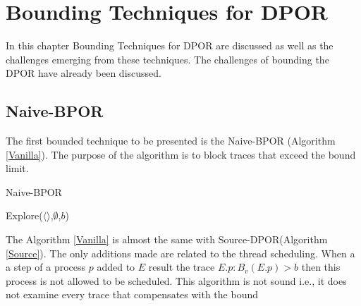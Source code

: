 \chapter{Bounding Techniques for DPOR}
\label{bounded}

In this chapter Bounding Techniques for DPOR are discussed as well as the challenges emerging from these techniques.
The challenges of bounding the DPOR have already been discussed.


\section{Naive-BPOR}

The first bounded technique to be presented is the Naive-BPOR (Algorithm \ref{Vanilla}). The purpose of the algorithm is to block traces that exceed the bound
limit. 

\begin{algorithm}
    \caption{Naive-BPOR}
    \label{Vanilla}
    Explore($\langle \rangle$,$\emptyset$,$b$)\;
\end{algorithm}

The Algorithm \ref{Vanilla} is almost the same with Source-DPOR(Algorithm \ref{Source}). The only additions made are
related to the thread scheduling. When a a step of a process $p$ added to $E$ result the trace $E.p : B_v(E.p) > b$ then
this process is not allowed to be scheduled. This algorithm is not sound i.e., it does not examine every trace that
compensates with the bound

